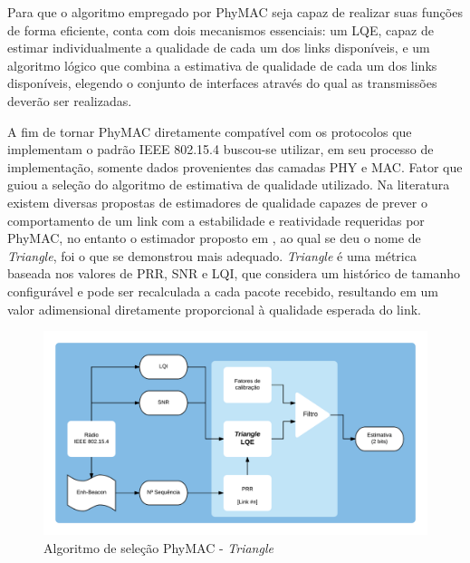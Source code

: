 \documentclass[
	12pt,				%
	openright,			%
	oneside,
	a4paper,			%
	english,			%
	french,				%
	spanish,			%
	brazil				%
	]{abntex2}
\begin{document}
Para que o algoritmo empregado por PhyMAC seja capaz de realizar suas funções de forma eficiente, conta com dois mecanismos essenciais: um LQE, capaz de estimar individualmente a qualidade de cada um dos links disponíveis, e um algoritmo lógico que combina a estimativa de qualidade de cada um dos links disponíveis, elegendo o conjunto de interfaces através do qual as transmissões deverão ser realizadas.

A fim de tornar PhyMAC diretamente compatível com os protocolos que implementam o padrão IEEE 802.15.4 buscou-se utilizar, em seu processo de implementação, somente dados provenientes das camadas PHY e MAC. Fator que guiou a seleção do algoritmo de estimativa de qualidade utilizado. Na literatura existem diversas propostas de estimadores de qualidade capazes de prever o comportamento de um link com a estabilidade e reatividade requeridas por PhyMAC, no entanto o estimador proposto em , ao qual se deu o nome de \textit{Triangle}, foi o que se demonstrou mais adequado. \textit{Triangle} é uma métrica baseada nos valores de PRR, SNR e LQI, que considera um histórico de tamanho configurável e pode ser recalculada a cada pacote recebido, resultando em um valor adimensional diretamente proporcional à qualidade esperada do link.

\begin{figure}[htb]
	\centering
	\caption{Algoritmo de seleção PhyMAC - \textit{Triangle}}
	\label{fig_phymac_trng}
	\includegraphics[width=\linewidth]{PhyMAC_TRNG}
\end{figure}
\end{document}
